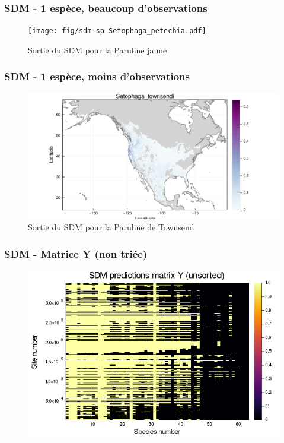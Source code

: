 \documentclass[10pt]{beamer}
\begin{document}
\begin{frame}
  \frametitle{SDM - 1 espèce, beaucoup d'observations}
  \begin{figure}
    \centering
    \hspace*{-2cm}\texttt{[image: fig/sdm-sp-Setophaga\_petechia.pdf]}
    \caption{Sortie du SDM pour la Paruline jaune}
  \end{figure}
\end{frame}

\begin{frame}
  \frametitle{SDM - 1 espèce, moins d'observations}
  \begin{figure}
    \centering
    \hspace*{-2cm}\includegraphics[scale=0.5]{fig/sdm-sp-Setophaga_townsendi.pdf}
    \caption{Sortie du SDM pour la Paruline de Townsend}
  \end{figure}
\end{frame}

\begin{frame}
  \frametitle{SDM - Matrice Y (non triée)}
  \begin{figure}
    \centering
    \includegraphics[scale=0.4]{fig/sdm-Y-unsorted.png}
  \end{figure}
\end{frame}
\end{document}
